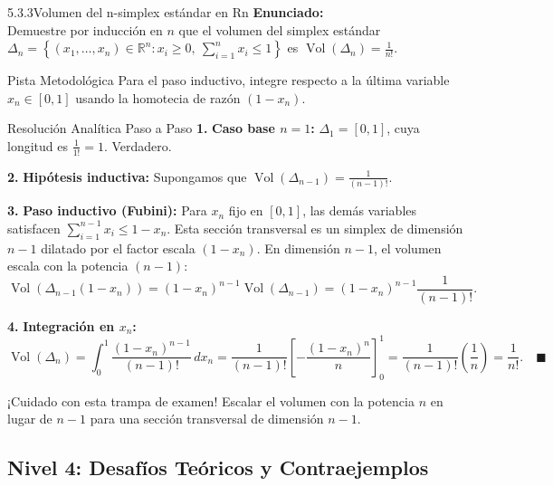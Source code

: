 \documentclass[11pt,a4paper]{article}
\begin{document}
\begin{nivelbox}{5.3.3}{Volumen del n-simplex estándar en Rn}
\textbf{Enunciado:}\\
Demuestre por inducción en $n$ que el volumen del simplex estándar $\Delta_n = \left\{ (x_1, \dots, x_n) \in \mathbb{R}^n : x_i \ge 0, \ \sum_{i=1}^n x_i \le 1 \right\}$ es $\operatorname{Vol}(\Delta_n) = \frac{1}{n!}$.

\begin{observacionbox}{Pista Metodológica}
Para el paso inductivo, integre respecto a la última variable $x_n \in [0, 1]$ usando la homotecia de razón $(1 - x_n)$.
\end{observacionbox}

\begin{ejerciciobox}{Resolución Analítica Paso a Paso}
\smallskip\noindent\textbf{1.} \textbf{Caso base $n = 1$:}
$\Delta_1 = [0, 1]$, cuya longitud es $\frac{1}{1!} = 1$. Verdadero.

\smallskip\noindent\textbf{2.} \textbf{Hipótesis inductiva:}
Supongamos que $\operatorname{Vol}(\Delta_{n-1}) = \frac{1}{(n-1)!}$.

\smallskip\noindent\textbf{3.} \textbf{Paso inductivo (Fubini):}
Para $x_n$ fijo en $[0, 1]$, las demás variables satisfacen $\sum_{i=1}^{n-1} x_i \le 1 - x_n$.
Esta sección transversal es un simplex de dimensión $n-1$ dilatado por el factor escala $(1 - x_n)$.
En dimensión $n-1$, el volumen escala con la potencia $(n-1)$:
\[\operatorname{Vol}(\Delta_{n-1}(1 - x_n)) = (1 - x_n)^{n-1} \operatorname{Vol}(\Delta_{n-1}) = (1 - x_n)^{n-1} \frac{1}{(n-1)!}.\]

\smallskip\noindent\textbf{4.} \textbf{Integración en $x_n$:}
\[\operatorname{Vol}(\Delta_n) = \int_0^1 \frac{(1 - x_n)^{n-1}}{(n-1)!} \, dx_n = \frac{1}{(n-1)!} \left[ -\frac{(1 - x_n)^n}{n} \right]_0^1 = \frac{1}{(n-1)!} \left( \frac{1}{n} \right) = \frac{1}{n!}. \quad \blacksquare\]
\end{ejerciciobox}

\begin{errorbox}{¡Cuidado con esta trampa de examen!}
Escalar el volumen con la potencia $n$ en lugar de $n-1$ para una sección transversal de dimensión $n-1$.
\end{errorbox}
\end{nivelbox}
\bigskip

\subsection{Nivel 4: Desafíos Teóricos y Contraejemplos}
\end{document}
